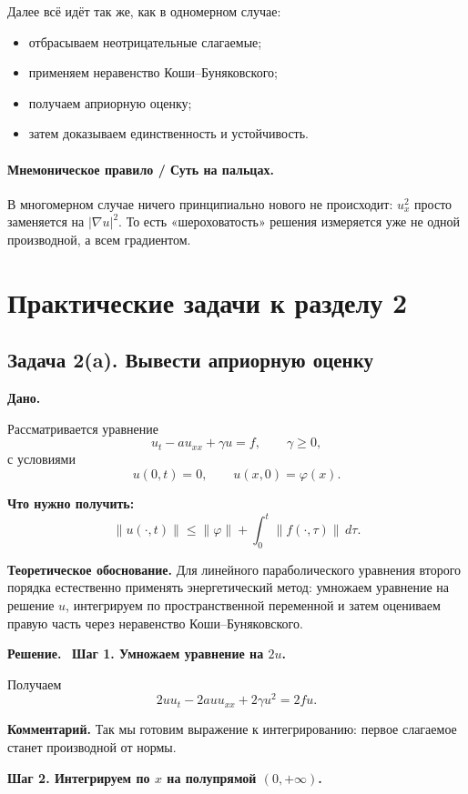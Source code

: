 \documentclass[a4paper,12pt]{article}
\newcommand{\Solution}{\textbf{Решение.}\ }
\begin{document}
Далее всё идёт так же, как в одномерном случае:
\begin{itemize}
  \item отбрасываем неотрицательные слагаемые;
  \item применяем неравенство Коши--Буняковского;
  \item получаем априорную оценку;
  \item затем доказываем единственность и устойчивость.
\end{itemize}

\paragraph{Мнемоническое правило / Суть на пальцах.}
В многомерном случае ничего принципиально нового не происходит: $u_x^2$ просто заменяется на $|\nabla u|^2$. То есть «шероховатость» решения измеряется уже не одной производной, а всем градиентом.

\section*{Практические задачи к разделу 2}

\subsection*{Задача 2(a). Вывести априорную оценку}

\textbf{Дано.}

Рассматривается уравнение
\[
u_t-a u_{xx}+\gamma u=f,
\qquad \gamma\ge 0,
\]
с условиями
\[
u(0,t)=0,
\qquad
u(x,0)=\varphi(x).
\]

\textbf{Что нужно получить:}
\[
\|u(\cdot,t)\|
\le
\|\varphi\|
+\int_0^t \|f(\cdot,\tau)\|\,d\tau.
\]

\textbf{Теоретическое обоснование.}
Для линейного параболического уравнения второго порядка естественно применять энергетический метод: умножаем уравнение на решение $u$, интегрируем по пространственной переменной и затем оцениваем правую часть через неравенство Коши--Буняковского.

\Solution
\textbf{Шаг 1. Умножаем уравнение на $2u$.}

Получаем
\[
2u u_t-2a u u_{xx}+2\gamma u^2=2fu.
\]

\textbf{Комментарий.} Так мы готовим выражение к интегрированию: первое слагаемое станет производной от нормы.

\textbf{Шаг 2. Интегрируем по $x$ на полупрямой $(0,+\infty)$.}
\end{document}
